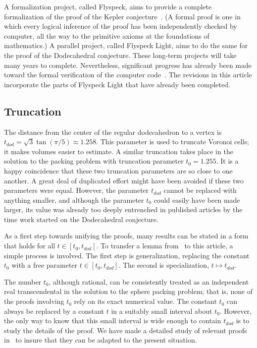 \documentclass{article} %
\begin{document}
A formalization project, called Flyspeck, aims to provide a complete
formalization of the proof of the Kepler
conjecture~\cite{website:FlyspeckProject, website:FlyspeckFactSheet}.
(A formal proof is one in which every logical inference of the
proof has been independently checked by computer, all the way to the
primitive axioms at the foundations of mathematics.) A parallel
project, called Flyspeck Light, aims to do the same for the proof of
the Dodecahedral conjecture. These long-term projects will take many
years to complete. Nevertheless, significant progress has already been
made toward the formal verification of the computer
code~\cite{Nipkow:2005:Tame,Obua:2008:Thesis}. The revisions in this
article incorporate the parts of Flyspeck Light that have already been
completed.

\subsection{Truncation}

The distance from the center of the regular dodecahedron to a vertex
is $t_{dod}=\sqrt{3}\tan(\pi/5)\approx 1.258$. This parameter is used
to truncate Voronoi cells; it makes volumes easier to estimate. A
similar truncation takes place in the solution to the packing problem
with truncation parameter $t_0 = 1.255$. It is a happy coincidence
that these two truncation parameters are so close to one another. A
great deal of duplicated effort might have been avoided if these two
parameters were equal. However, the parameter $t_{dod}$ cannot be
replaced with anything smaller, and although the parameter $t_0$ could
easily have been made larger, its value was already too deeply
entrenched in published articles by the time work started on the
Dodecahedral conjecture.

 As a first step towards unifying the proofs, many results can be
stated in a form that holds for all $t\in[t_0,t_{dod}]$. To transfer a
lemma from~\cite{Hales:2006:DCG} to this article, a simple process is
involved. The first step is generalization, replacing the constant
$t_0$ with a free parameter $t\in[t_0,t_{dod}]$. The second is
specialization, $t\mapsto t_{dod}$.

The number $t_0$, although rational, can be consistently treated as an
independent real transcendental in the solution to the sphere packing
problem; that is, none of the proofs involving $t_0$ rely on its exact
numerical value. The constant $t_0$ can always be replaced by a
constant $t$ in a suitably small interval about $t_0$. However, the
only way to know that this small interval is wide enough to contain
$t_{dod}$ is to study the details of the proof. We have made a
detailed study of relevant proofs in~\cite{Hales:2006:DCG} to insure
that they can be adapted to the present situation.
\end{document}
